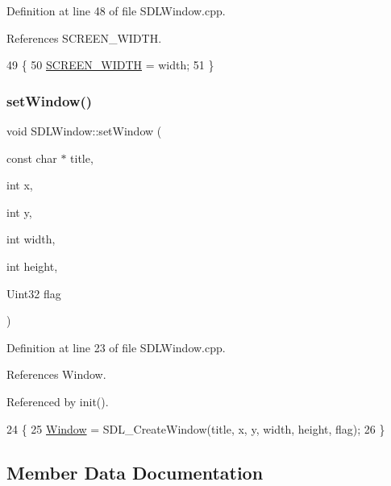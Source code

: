 Definition at line 48 of file S\+D\+L\+Window.\+cpp.



References S\+C\+R\+E\+E\+N\+\_\+\+W\+I\+D\+TH.


\begin{DoxyCode}
49 \{
50     \hyperlink{class_s_d_l_window_ab3faec77de829876613ea52176ef61e1}{SCREEN\_WIDTH} = width;
51 \}
\end{DoxyCode}
\mbox{\label{class_s_d_l_window_ad14a7b1965115315210ba34b7239e598}} 
\subsubsection{\texorpdfstring{set\+Window()}{setWindow()}}
{\footnotesize\ttfamily void S\+D\+L\+Window\+::set\+Window (\begin{DoxyParamCaption}\item[{const char $\ast$}]{title,  }\item[{int}]{x,  }\item[{int}]{y,  }\item[{int}]{width,  }\item[{int}]{height,  }\item[{Uint32}]{flag }\end{DoxyParamCaption})}



Definition at line 23 of file S\+D\+L\+Window.\+cpp.



References Window.



Referenced by init().


\begin{DoxyCode}
24 \{
25     \hyperlink{class_s_d_l_window_aa95576b14f59ec62a9e7f6fb8c2f79cc}{Window} = SDL\_CreateWindow(title, x, y, width, height, flag);
26 \}
\end{DoxyCode}


\subsection{Member Data Documentation}
\mbox{\label{class_s_d_l_window_ae679402fd05b8eb3fd8680f1f036aaca}} 
